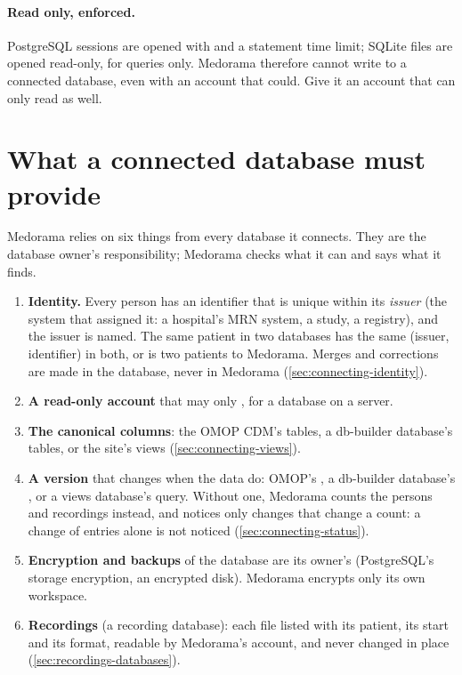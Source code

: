 \paragraph{Read only, enforced.} PostgreSQL sessions are opened with
 and a statement time limit; SQLite files are opened
read-only, for queries only. Medorama therefore cannot write to a connected database, even with
an account that could. Give it an account that can only read as well.

\section{What a connected database must provide}
\label{sec:connecting-requirements}
\label{sec:connecting-must-say}

Medorama relies on six things from every database it connects. They are the database owner's
responsibility; Medorama checks what it can and says what it finds.
\begin{enumerate}
\item \textbf{Identity.} Every person has an identifier that is unique within its \emph{issuer}
  (the system that assigned it: a hospital's MRN system, a study, a registry), and the issuer is
  named. The same patient in two databases has the same (issuer, identifier) in both, or is two
  patients to Medorama. Merges and corrections are made in the database, never in Medorama
  (\cref{sec:connecting-identity}).
\item \textbf{A read-only account} that may only , for a database on a server.
\item \textbf{The canonical columns}: the OMOP CDM's tables, a db-builder database's tables, or
  the site's views (\cref{sec:connecting-views}).
\item \textbf{A version} that changes when the data do: OMOP's , a db-builder
  database's , or a views database's  query. Without one,
  Medorama counts the persons and recordings instead, and notices only changes that change a
  count: a change of entries alone is not noticed (\cref{sec:connecting-status}).
\item \textbf{Encryption and backups} of the database are its owner's (PostgreSQL's storage
  encryption, an encrypted disk). Medorama encrypts only its own workspace.
\item \textbf{Recordings} (a recording database): each file listed with its patient, its start
  and its format, readable by Medorama's account, and never changed in place
  (\cref{sec:recordings-databases}).
\end{enumerate}

